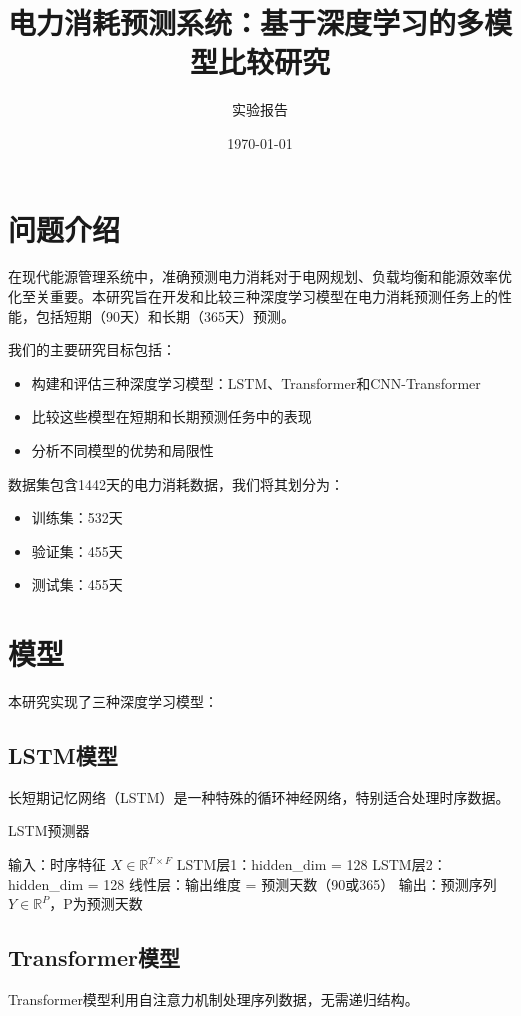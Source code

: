 \documentclass[a4paper,11pt]{article}
\title{电力消耗预测系统：基于深度学习的多模型比较研究}
\author{实验报告}
\date{\today}
\begin{document}
\maketitle

\section{问题介绍}
在现代能源管理系统中，准确预测电力消耗对于电网规划、负载均衡和能源效率优化至关重要。本研究旨在开发和比较三种深度学习模型在电力消耗预测任务上的性能，包括短期（90天）和长期（365天）预测。

我们的主要研究目标包括：
\begin{itemize}
    \item 构建和评估三种深度学习模型：LSTM、Transformer和CNN-Transformer
    \item 比较这些模型在短期和长期预测任务中的表现
    \item 分析不同模型的优势和局限性
\end{itemize}

数据集包含1442天的电力消耗数据，我们将其划分为：
\begin{itemize}
    \item 训练集：532天
    \item 验证集：455天
    \item 测试集：455天
\end{itemize}

\section{模型}
本研究实现了三种深度学习模型：

\subsection{LSTM模型}
长短期记忆网络（LSTM）是一种特殊的循环神经网络，特别适合处理时序数据。

\begin{algorithm}
\caption{LSTM预测器}
\begin{algorithmic}[1]
\STATE 输入：时序特征 $X \in \mathbb{R}^{T \times F}$
\STATE LSTM层1：hidden\_dim = 128
\STATE LSTM层2：hidden\_dim = 128
\STATE 线性层：输出维度 = 预测天数（90或365）
\STATE 输出：预测序列 $Y \in \mathbb{R}^{P}$，P为预测天数
\end{algorithmic}
\end{algorithm}

\subsection{Transformer模型}
Transformer模型利用自注意力机制处理序列数据，无需递归结构。
\end{document}

